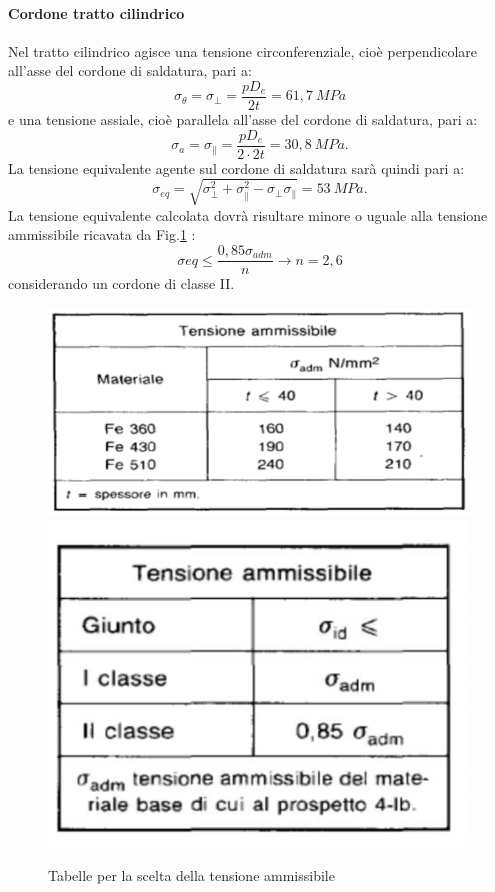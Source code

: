 \paragraph{Cordone tratto cilindrico}
Nel tratto cilindrico agisce una tensione circonferenziale, cioè perpendicolare all'asse del cordone di saldatura, pari a:
\begin{equation}
    \sigma_{\theta}=\sigma_{\perp}=\frac{p D_e}{2t}=61,7\ MPa
\end{equation}
e una tensione assiale, cioè parallela all'asse del cordone di saldatura, pari a:
\begin{equation}
    \sigma_a=\sigma_{\parallel}=\frac{pD_e}{2\cdot 2t}=30,8\ MPa.
\end{equation}
La tensione equivalente agente sul cordone di saldatura sarà quindi pari a:
\begin{equation}
    \sigma_{eq}=\sqrt{\sigma_{\perp}^2+\sigma_{\parallel}^2-\sigma_{\perp}\sigma_{\parallel}}=53\ MPa. 
\end{equation}
La tensione equivalente calcolata dovrà risultare minore o uguale alla tensione ammissibile ricavata da Fig.\ref{fig:TensioneAmmissibileCordone} :
\begin{equation}
    \sigma{eq}\le \frac{0,85\sigma_{adm}}{n}\to n=2,6
\end{equation}
considerando un cordone di classe II.
\begin{figure}[h]
    \centering
    \includegraphics[scale=0.473]{Immagini/TensioneAmmissibileCordone1.png}
    \includegraphics[scale=0.5]{Immagini/TensioneAmmissibileCordone2.png}
    \caption{Tabelle per la scelta della tensione ammissibile}
    \label{fig:TensioneAmmissibileCordone}
\end{figure}
